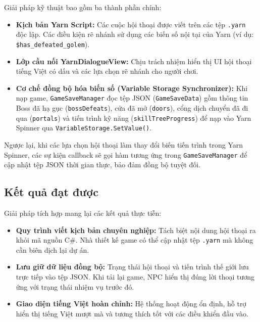Giải pháp kỹ thuật bao gồm ba thành phần chính:
\begin{itemize}
    \item \textbf{Kịch bản Yarn Script:} Các cuộc hội thoại được viết trên các tệp \texttt{.yarn} độc lập. Các điều kiện rẽ nhánh sử dụng các biến số nội tại của Yarn (ví dụ: \texttt{\$has\_defeated\_golem}).
    \item \textbf{Lớp cầu nối YarnDialogueView:} Chịu trách nhiệm hiển thị UI hội thoại tiếng Việt có dấu và các lựa chọn rẽ nhánh cho người chơi.
    \item \textbf{Cơ chế đồng bộ hóa biến số (Variable Storage Synchronizer):} Khi nạp game, \texttt{GameSaveManager} đọc tệp JSON (\texttt{GameSaveData}) gồm thông tin Boss đã hạ gục (\texttt{bossDefeats}), cửa đã mở (\texttt{doors}), cổng dịch chuyển đã đi qua (\texttt{portals}) và tiến trình kỹ năng (\texttt{skillTreeProgress}) để nạp vào Yarn Spinner qua \texttt{VariableStorage.SetValue()}.
\end{itemize}

Ngược lại, khi các lựa chọn hội thoại làm thay đổi biến tiến trình trong Yarn Spinner, các sự kiện callback sẽ gọi hàm tương ứng trong \texttt{GameSaveManager} để cập nhật tệp JSON thời gian thực, bảo đảm đồng bộ tuyệt đối.

\subsection{Kết quả đạt được}
Giải pháp tích hợp mang lại các kết quả thực tiễn:
\begin{itemize}
    \item \textbf{Quy trình viết kịch bản chuyên nghiệp:} Tách biệt nội dung hội thoại ra khỏi mã nguồn C\#. Nhà thiết kế game có thể cập nhật tệp \texttt{.yarn} mà không cần biên dịch lại dự án.
    \item \textbf{Lưu giữ dữ liệu đồng bộ:} Trạng thái hội thoại và tiến trình thế giới lưu trực tiếp vào tệp JSON. Khi tải lại game, NPC hiển thị đúng lời thoại tương ứng với trạng thái nhiệm vụ trước đó.
    \item \textbf{Giao diện tiếng Việt hoàn chỉnh:} Hệ thống hoạt động ổn định, hỗ trợ hiển thị tiếng Việt mượt mà và tương thích tốt với các điều khiển đầu vào.
\end{itemize}
